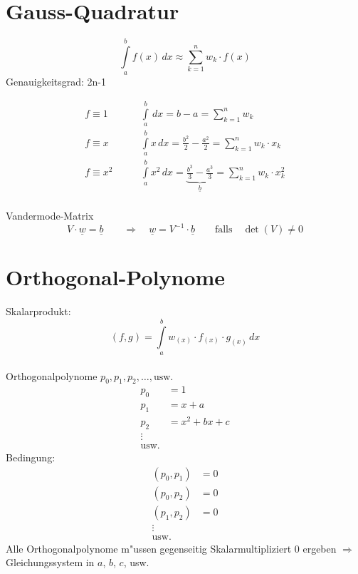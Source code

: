 \section{Gauss-Quadratur}
\begin{equation}
	\int\limits_a^b f(x)\,dx\approx\sum\limits_{k=1}^n w_k\cdot f(x)
\end{equation}
\noindent Genauigkeitsgrad: 2n-1

\begin{align*}
	f\equiv 1 \qquad   & \int\limits_a^b\,dx = b-a = \sum\limits_{k=1}^n w_k \\
	f\equiv x \qquad   & \int\limits_a^b x\,dx = \frac{b^2}{2}-\frac{a^2}{2} = \sum\limits_{k=1}^n w_k\cdot x_k \\
	f\equiv x^2 \qquad & \int\limits_a^b x^2\,dx = \underbrace{\frac{b^3}{3}-\frac{a^3}{3}}_{\underline{b}} = \sum\limits_{k=1}^n w_k\cdot x_k^2 \\
\end{align*}

\noindent Vandermode-Matrix
\begin{equation}
	V\cdot\underline{w}=\underline{b}\qquad\Longrightarrow\quad\underline{w}=V^{-1}\cdot\underline{b}\qquad\text{falls}\quad\det(V)\neq0
\end{equation}

\section{Orthogonal-Polynome}
Skalarprodukt: $$(f,g)=\int\limits_a^b w_{(x)}\cdot f_{(x)}\cdot g_{(x)}\,dx$$ \\
Orthogonalpolynome $p_0,p_1,p_2,\ldots,\text{usw.}$
\begin{align*}
	p_0 &= 1 \\
	p_1 &= x+a \\
	p_2 &= x^2 + bx + c \\
	\vdots \\
	\text{usw.}
\end{align*}
\noindent Bedingung:
\begin{align*}
	(p_0,p_1) &= 0 \\
	(p_0,p_2) &= 0 \\
	(p_1,p_2) &= 0 \\
	\vdots \\
	\text{usw.}
\end{align*}
\noindent Alle Orthogonalpolynome m"ussen gegenseitig Skalarmultipliziert $0$ ergeben $\Longrightarrow$ Gleichungssystem in $a$, $b$, $c$, usw.

%
%
